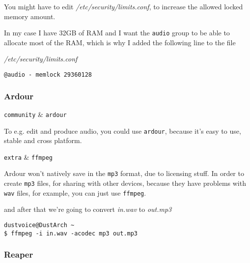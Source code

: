 \documentclass[10pt]{dustdoc}
\begin{document}
You might have to edit \textit{/etc/security/limits.conf}, to increase the allowed locked memory amount.

In my case I have 32GB of RAM and I want the \texttt{audio} group to be able to allocate most of the RAM, which is why I added the following line to the file

\begin{mintedlisting}
    \caption*{\textit{/etc/security/limits.conf}}
    \begin{verbatim}
@audio - memlock 29360128
    \end{verbatim}
\end{mintedlisting}

\subsubsection{Ardour}
\label{sec:ardour}

\begin{packagetable}
    \texttt{community} & \texttt{ardour} \\ 
\end{packagetable}

To e.g. edit and produce audio, you could use \texttt{ardour}, because it’s easy to use, stable and cross platform.

\begin{NOTE}
    \begin{packagetable}
        \texttt{extra} & \texttt{ffmpeg} \\ 
    \end{packagetable}

    Ardour won’t natively save in the \texttt{mp3} format, due to licensing stuff.
    In order to create \texttt{mp3} files, for sharing with other devices, because they have problems with \texttt{wav} files, for example, you can just use \texttt{ffmpeg}.

    and after that we’re going to convert \textit{in.wav} to \textit{out.mp3}

    \begin{verbatim}
dustvoice@DustArch ~
$ ffmpeg -i in.wav -acodec mp3 out.mp3
    \end{verbatim}
\end{NOTE}

\subsubsection{Reaper}
\label{sec:reaper}
\end{document}
